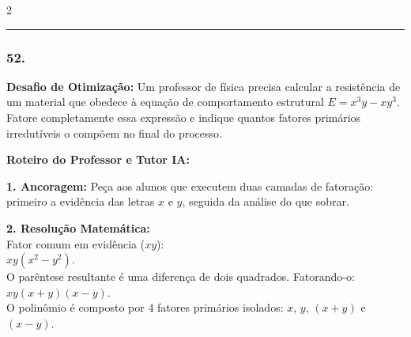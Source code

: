 \begin{multicols*}{2}
\par\vspace{\espacoQuestao}

\noindent\textcolor{CorLinha}{\rule{\linewidth}{0.5pt}} 
\par\vspace{\espacoPreQuestao}
\subsubsection*{52.} 
\begin{enunciadoLiteral}
\textbf{Desafio de Otimização:} Um professor de física precisa calcular a resistência de um material que obedece à equação de comportamento estrutural $E = x^3y - xy^3$. Fatore completamente essa expressão e indique quantos fatores primários irredutíveis o compõem no final do processo.
\end{enunciadoLiteral}

\ifgabarito
    \begin{tcolorbox}[colback=CorTitUm!5, colframe=CorTitUm, boxrule=1pt, arc=4pt, left=6pt, right=6pt, top=6pt, bottom=6pt]
    \small\textbf{\textcolor{CorTitUm}{Roteiro do Professor e Tutor IA:}}\par\vspace{0.1cm}
    \color{CinzaEscuro}
    \textbf{1. Ancoragem:} Peça aos alunos que executem duas camadas de fatoração: primeiro a evidência das letras $x$ e $y$, seguida da análise do que sobrar.\par\vspace{0.1cm}
    \textbf{2. Resolução Matemática:}\\
    Fator comum em evidência ($xy$):\\
    $xy(x^2 - y^2)$.\\
    O parêntese resultante é uma diferença de dois quadrados. Fatorando-o:\\
    $xy(x + y)(x - y)$.\\
    O polinômio é composto por 4 fatores primários isolados: $x$, $y$, $(x+y)$ e $(x-y)$.
    \end{tcolorbox}
\fi

\par\vspace{\espacoQuestao}

\end{multicols*}

